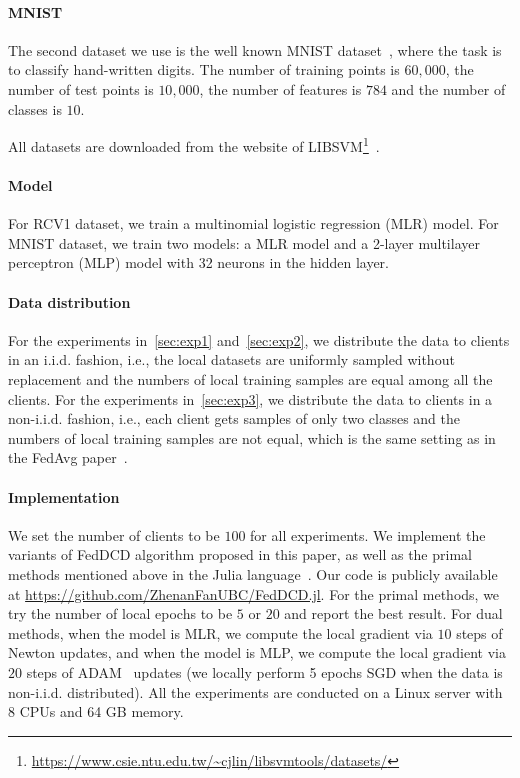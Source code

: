 \paragraph{MNIST} The second dataset we use is the well known MNIST dataset~\citep{lecun1998gradient}, where the task is to classify hand-written digits. The number of training points is $60,000$, the number of test points is $10,000$, the number of features is $784$ and the number of classes is $10$.

All datasets are downloaded from the website of LIBSVM\footnote{\url{https://www.csie.ntu.edu.tw/~cjlin/libsvmtools/datasets/}}~\citep{libsvm}.

\paragraph{Model} For RCV1 dataset, we train a multinomial logistic regression (MLR) model. For MNIST dataset, we train two models: a MLR model and a 2-layer multilayer perceptron (MLP) model with 32 neurons in the hidden layer. 

\paragraph{Data distribution} For the experiments in~\autoref{sec:exp1} and~\autoref{sec:exp2}, we distribute the data to clients in an i.i.d. fashion, i.e., the local datasets are uniformly sampled without replacement and the numbers of local training samples are equal among all the clients. For the experiments in~\autoref{sec:exp3},  we distribute the data to clients in a non-i.i.d. fashion, i.e., each client gets samples of only two classes and the numbers of local training samples are not equal, which is the same setting as in the FedAvg paper~\citep{mcmahan2017communication}.

\paragraph{Implementation}  We set the number of clients to be $100$ for all experiments. We implement the variants of FedDCD algorithm proposed in this paper, as well as the primal methods mentioned above in the Julia language~\citep{bezanson2017julia}. Our code is publicly available at \url{https://github.com/ZhenanFanUBC/FedDCD.jl}. For the primal methods, we try the number of local epochs to be $5$ or $20$ and report the best result. For dual methods, when the model is MLR, we compute the local gradient via $10$ steps of Newton updates, and when the model is MLP, we compute the local gradient via $20$ steps of ADAM~\citep{kingma2014adam} updates (we locally perform 5 epochs SGD when the data is non-i.i.d. distributed). All the experiments are conducted on a Linux server with 8 CPUs and 64 GB memory. 

